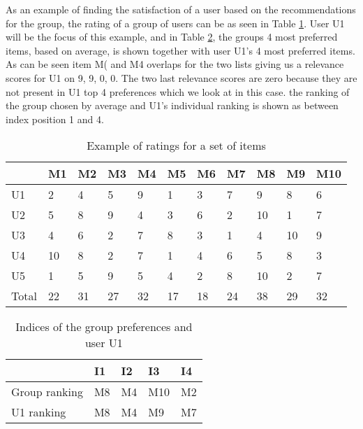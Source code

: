 As an example of finding the satisfaction of a user based on the recommendations for the group, the rating of a group of users can be as seen in Table \ref{tbl:testandeval_bordacount}. User U1 will be the focus of this example, and in Table \ref{tbl:testandeval_positions}, the groups 4 most preferred items, based on average, is shown together with user U1's 4 most preferred items. As can be seen item M( and M4 overlaps for the two lists giving us a relevance scores for U1 on 9, 9, 0, 0. The two last relevance scores are zero because they are not present in U1 top 4 preferences which we look at in this case.
the ranking of the group chosen by average and U1's individual ranking is shown as between index position 1 and 4.

\begin{table}[H]
	\centering
	\begin{tabular}{l|l|l|l|l|l|l|l|l|l|l|}
		\cline{2-11}
		& M1 & M2 & M3 & M4 & M5 & M6 & M7 & M8 & M9 & M10 \\ \hline
		\multicolumn{1}{|l|}{U1} & 2 & 4 & 5 & 9 & 1 & 3 & 7 & 9 & 8 & 6 \\ \hline
		\multicolumn{1}{|l|}{U2} & 5 & 8 & 9 & 4 & 3 & 6 & 2 & 10 & 1 & 7 \\ \hline
		\multicolumn{1}{|l|}{U3} & 4 & 6 & 2 & 7 & 8 & 3 & 1 & 4 & 10 & 9 \\ \hline
		\multicolumn{1}{|l|}{U4} & 10 & 8 & 2 & 7 & 1 & 4 & 6 & 5 & 8 & 3 \\ \hline
		\multicolumn{1}{|l|}{U5} & 1 & 5 & 9 & 5 & 4 & 2 & 8 & 10 & 2 & 7 \\ \hline
		\multicolumn{1}{|l|}{Total} & 22 & 31 & 27 & 32 & 17 & 18 & 24 & 38 & 29 & 32 \\ \hline
	\end{tabular}
	\caption{Example of ratings for a set of items}
	\label{tbl:testandeval_bordacount}
\end{table}

\begin{table}[H]
	\centering
	\begin{tabular}{l|l|l|l|l|}
		\cline{2-5}
		& I1 & I2 & I3 & I4\\ \hline
		\multicolumn{1}{|l|}{Group ranking} & M8 & M4 & M10 & M2\\ \hline
		\multicolumn{1}{|l|}{U1 ranking} & M8 & M4 & M9 & M7\\ \hline
	\end{tabular}
	\caption{Indices of the group preferences and user U1}
	\label{tbl:testandeval_positions}
\end{table}


